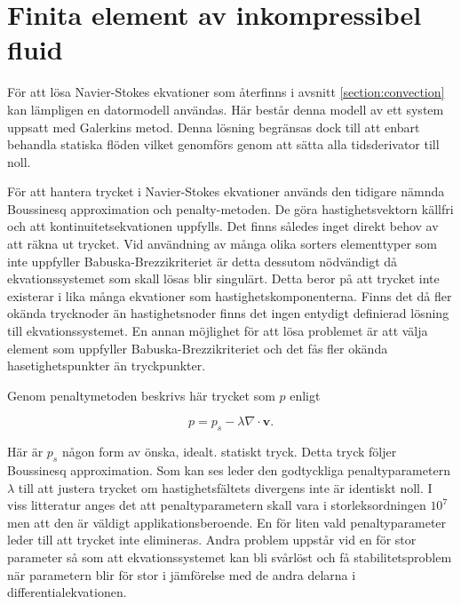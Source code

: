 \section{Finita element av inkompressibel fluid}
\label{sec:femconvection}
För att lösa Navier-Stokes ekvationer som återfinns i avsnitt
\ref{section:convection} kan lämpligen en datormodell användas.
Här består denna modell av ett system uppsatt med Galerkins metod.
Denna lösning begränsas dock till att enbart behandla statiska flöden
vilket genomförs genom att sätta alla tidsderivator till noll.

För att hantera trycket i Navier-Stokes ekvationer
används den tidigare nämnda Boussinesq approximation
och penalty-metoden. De göra hastighetsvektorn källfri och att
kontinuitetsekvationen uppfylls. Det finns således inget direkt behov av att räkna ut trycket.
Vid användning av många olika sorters elementtyper som inte uppfyller Babuska-Brezzikriteriet
är detta dessutom nödvändigt då ekvationssystemet som skall lösas blir singulärt. 
Detta beror på att trycket inte existerar i lika många ekvationer som hastighetskomponenterna.
Finns det då fler okända trycknoder än hastighetsnoder finns det ingen entydigt definierad lösning
till ekvationssystemet. En annan möjlighet för att lösa problemet är att välja element som
uppfyller Babuska-Brezzikriteriet och det fås fler okända hasetighetspunkter än tryckpunkter.
\cite{babuska1973}\cite{segal2011}

Genom penaltymetoden beskrivs här trycket som $p$ enligt 

\begin{equation}
\label{eq:femconvection:penalty}
p = p_s - \lambda\nabla\cdot\mathbf{v}.
\end{equation}

Här är $p_s$ någon form av önska, idealt. statiskt
tryck. Detta tryck följer Boussinesq approximation.
\cite{heinrich88}\cite{taylor79}
Som kan ses leder den godtyckliga penaltyparametern $\lambda$ till att justera trycket
om hastighetsfältets divergens inte är identiskt noll. I viss litteratur anges 
det att penaltyparametern skall vara i storleksordningen $10^7$ men att den
är väldigt applikationsberoende. En för liten vald penaltyparameter leder till att
trycket inte elimineras. Andra problem uppstår vid en för stor parameter så som att ekvationssystemet
kan bli svårlöst och få stabilitetsproblem när parametern blir
för stor i jämförelse med de andra delarna i differentialekvationen.\cite{reddy93}\cite{roy05}\cite{basak04}\cite{segal2011}

